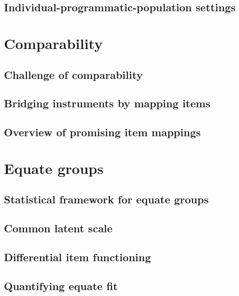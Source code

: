 \documentclass[]{book}
\theoremstyle{definition}
\theoremstyle{definition}
\theoremstyle{definition}
\theoremstyle{remark}
\begin{document}
\section{Individual-programmatic-population
settings}\label{individual-programmatic-population-settings}

\chapter{Comparability}\label{ch:comparability}

\section{Challenge of comparability}\label{challenge-of-comparability}

\section{Bridging instruments by mapping
items}\label{bridging-instruments-by-mapping-items}

\section{Overview of promising item
mappings}\label{overview-of-promising-item-mappings}

\chapter{Equate groups}\label{ch:equategroups}

\section{Statistical framework for equate
groups}\label{statistical-framework-for-equate-groups}

\section{Common latent scale}\label{common-latent-scale}

\section{Differential item
functioning}\label{differential-item-functioning}

\section{Quantifying equate fit}\label{quantifying-equate-fit}
\end{document}
